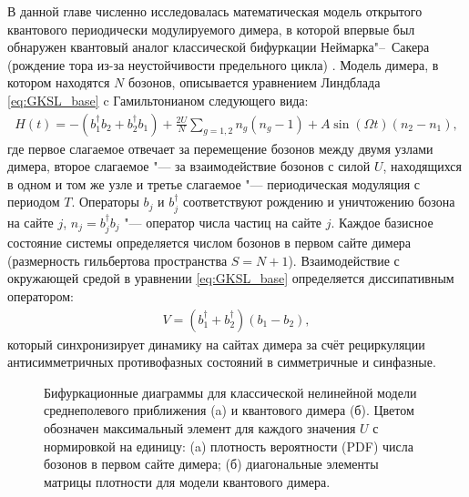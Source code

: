 В данной главе численно исследовалась математическая модель открытого квантового периодически модулируемого димера, в которой впервые был обнаружен квантовый аналог классической бифуркации Неймарка"--~Сакера (рождение тора из-за неустойчивости предельного цикла) \cite{Yusipov2019_1}. Модель димера, в котором находятся $N$ бозонов, описывается уравнением Линдблада \cref{eq:GKSL_base} c Гамильтонианом следующего вида:
\begin{equation}
	\label{eq:dimer_H}
	\begin{gathered}
		H(t) = -\left(b^\dagger_1 b_2 + b^\dagger_2 b_1\right) + \frac{2 U}{N} \sum_{g=1,2} n_g \left(n_g - 1\right) + A \sin(\Omega t) \left(n_2 - n_1\right),
	\end{gathered}
\end{equation}
где первое слагаемое отвечает за перемещение бозонов между двумя узлами димера, второе слагаемое "--- за взаимодействие бозонов с силой \(U\), находящихся в  одном и том же узле и третье слагаемое "--- периодическая модуляция с периодом $T$. 
Операторы \(b_j\) и \(b^\dagger_j\) соответствуют рождению и уничтожению бозона на сайте \(j\), \(n_j = b^\dagger_j b_j\) "--- оператор числа частиц на сайте \(j\).
Каждое базисное состояние системы определяется числом бозонов в первом сайте димера (размерность гильбертова пространства \(S = N + 1\)).
Взаимодействие с окружающей средой в уравнении \cref{eq:GKSL_base} определяется диссипативным оператором:
\begin{equation}
	\label{eq:dimer_diss}
	\begin{gathered}
		V = ( b^\dagger_1 + b^\dagger_2) \left( b_1 - b_2 \right),
	\end{gathered}
\end{equation}
который синхронизирует динамику на сайтах димера за счёт рециркуляции антисимметричных противофазных состояний в симметричные и синфазные.
\begin{figure}[ht]
	\caption[]
	{
		Бифуркационные диаграммы для классической нелинейной модели среднеполевого приближения (a) и квантового димера (б). Цветом обозначен максимальный элемент для каждого значения \(U\) с нормировкой на единицу: (a) плотность вероятности (PDF) числа бозонов в первом сайте димера; (б) диагональные элементы матрицы плотности для модели квантового димера.
	}
	\label{fig:neimark_1}
\end{figure}

